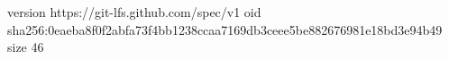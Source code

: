 version https://git-lfs.github.com/spec/v1
oid sha256:0eaeba8f0f2abfa73f4bb1238ccaa7169db3ceee5be882676981e18bd3e94b49
size 46
